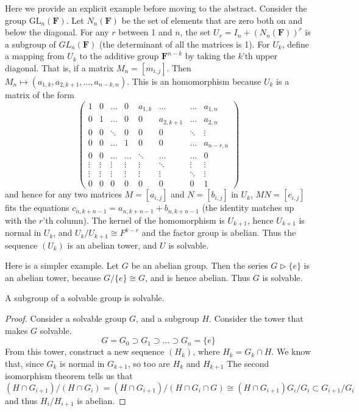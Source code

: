 Here we provide an explicit example before moving to the abstract. Consider the group $\mathrm{GL}_n(\mathbf{F})$. Let $N_n(\mathbf{F})$ be the set of elements that are zero both on and below the diagonal. For any $r$ between 1 and $n$, the set $U_r = I_n + (N_n(\mathbf{F}))^{r}$ is a subgroup of $GL_n(\mathbf{F})$ (the determinant of all the matrices is 1). For $U_k$, define a mapping from $U_k$ to the additive group $\mathbf{F}^{n-k}$ by taking the $k$'th upper diagonal. That is, if a matrix $M_n = [m_{i,j}]$. Then $M_n \mapsto (a_{1,k}, a_{2,k+1}, \dots, a_{n-k,n})$. This is an homomorphism because $U_k$ is a matrix of the form
%
\[ \begin{pmatrix} 1 & 0 & \dots & 0 & a_{1,k} & \dots & \dots & a_{1,n}\\
                   0 & 1 & \dots & 0 & 0 & a_{2,k+1} & \dots & a_{2,n}\\
                   0 & 0 & \ddots & 0 & 0 & 0 & \ddots & \vdots\\
                   0 & 0 & \dots & 1 & 0 & 0 & \dots & a_{n-r,n}\\
                   0 & 0 & \dots & \dots & \ddots & \dots & \dots & 0\\
                   \vdots & \vdots & \vdots & \vdots & \vdots & \ddots & \vdots & \vdots\\
                   \vdots & \vdots & \vdots & \vdots & \vdots & \vdots & \ddots & \vdots\\
                   0 & 0 & 0 & 0 & 0 & 0 & 0 & 1 \end{pmatrix} \]
%
and hence for any two matrices $M = [a_{i,j}]$ and $N = [b_{i,j}]$ in $U_k$, $MN = [c_{i,j}]$ fits the equations $c_{n,k + n - 1} = a_{n,k + n - 1} + b_{n,k + n - 1}$ (the identity matches up with the $r$'th column). The kernel of the homomorphism is $U_{k+1}$, hence $U_{k+1}$ is normal in $U_k$, and $U_k/U_{k+1} \cong F^{k-r}$ and the factor group is abelian. Thus the sequence $(U_k)$ is an abelian tower, and $U$ is solvable.

Here is a simpler example. Let $G$ be an abelian group. Then the series $G \rhd \{e\}$ is an abelian tower, because $G/\{e\} \cong G$, and is hence abelian. Thus $G$ is solvable.

\begin{theorem}
    A subgroup of a solvable group is solvable.
\end{theorem}
\begin{proof}
    Consider a solvable group $G$, and a subgroup $H$. Consider the tower that makes $G$ solvable.
    \[ G = G_0 \supset G_1 \supset \dots \supset G_n = \{ e \} \]
    From this tower, construct a new sequence $(H_k)$, where $H_k = G_k \cap H$. We know that, since $G_k$ is normal in $G_{k+1}$, so too are $H_k$ and $H_{k+1}$ The second isomorphism theorem tells us that
    \[ (H \cap G_{i+1})/(H \cap G_i) = (H \cap G_{i+1})/(H \cap G_i \cap G) \cong (H \cap G_{i+1})G_i/G_i \subset G_{i+1}/G_i \]
    and thus $H_i/H_{i+1}$ is abelian.
\end{proof}

